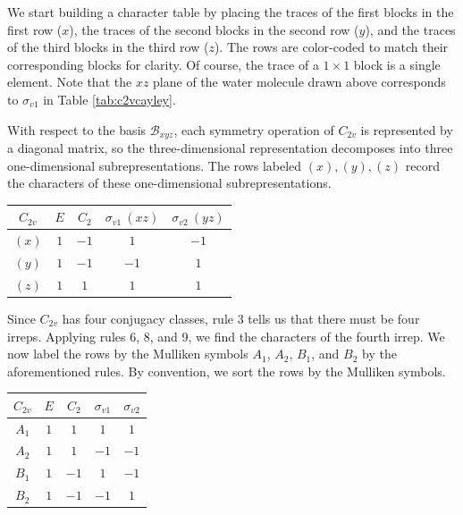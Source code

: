 \documentclass{article}
\begin{document}
    We start building a character table by placing the traces of the first blocks in the first row ($x$), the traces of the second blocks in the second row ($y$), and the traces of the third blocks in the third row ($z$). The rows are color-coded to match their corresponding blocks for clarity. Of course, the trace of a $1\times 1$ block is a single element. Note that the $xz$ plane of the water molecule drawn above corresponds to $\sigma_{v1}$ in Table \ref{tab:c2vcayley}.

    With respect to the basis $\mathcal B_{xyz}$, each symmetry operation of $C_{2v}$ is represented by a diagonal matrix, so the three-dimensional representation decomposes into three one-dimensional subrepresentations. The rows labeled $(x), (y), (z)$ record the characters of these one-dimensional subrepresentations.

    \begin{table}[htbp]
        \centering
        \renewcommand{\arraystretch}{1.5}
        \begin{tabular}{c|cccc}
            $C_{2v}$ & $E$ & $C_2$ & $\sigma_{v1}~(xz)$ & $\sigma_{v2}~(yz)$\\
            \hline
            \color{red}$(x)$ & \color{red}$1$ & \color{red}$-1$ & \color{red}$1$ & \color{red}$-1$\\
            \color{green!60!black}$(y)$ & \color{green!60!black}$1$ & \color{green!60!black}$-1$ & \color{green!60!black}$-1$ & \color{green!60!black}$1$\\
            \color{blue}$(z)$ & \color{blue}$1$ & \color{blue}$1$ & \color{blue}$1$ & \color{blue}$1$
        \end{tabular}
    \end{table}

    Since $C_{2v}$ has four conjugacy classes, rule 3 tells us that there must be four irreps. Applying rules 6, 8, and 9, we find the characters of the fourth irrep. We now label the rows by the Mulliken symbols $A_1$, $A_2$, $B_1$, and $B_2$ by the aforementioned rules. By convention, we sort the rows by the Mulliken symbols.

    \begin{table}[htbp]
        \centering
        \renewcommand{\arraystretch}{1.5}
        \begin{tabular}{c|cccc}
            $C_{2v}$ & $E$ & $C_2$ & $\sigma_{v1}$ & $\sigma_{v2}$\\
            \hline
            $A_1$ & $1$ & $1$ & $1$ & $1$\\
            $A_2$ & $1$ & $1$ & $-1$ & $-1$\\
            $B_1$ & $1$ & $-1$ & $1$ & $-1$\\
            $B_2$ & $1$ & $-1$ & $-1$ & $1$\\
        \end{tabular}
    \end{table}
    
\end{document}

